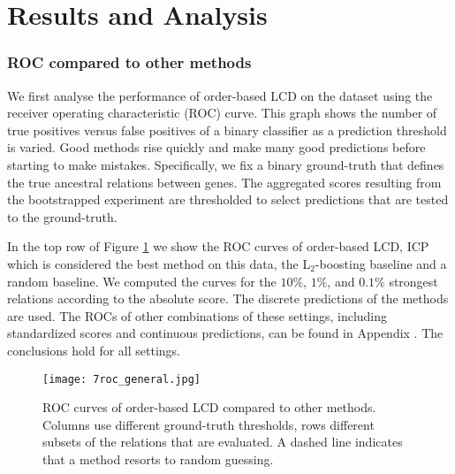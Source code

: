 \newpage
\section{Results and Analysis}
\label{chapter:analysis}






\subsubsection{ROC compared to other methods}

We first analyse the performance of order-based LCD on the \citet{kemmeren2014large} dataset using the receiver operating characteristic (ROC) curve. This graph shows the number of true positives versus false positives of a binary classifier as a prediction threshold is varied. Good methods rise quickly and make many good predictions before starting to make mistakes. Specifically, we fix a binary ground-truth that defines the true ancestral relations between genes. The aggregated scores resulting from the bootstrapped experiment are thresholded to select predictions that are tested to the ground-truth.

In the top row of Figure \ref{fig:7:rocgen} we show the ROC curves of order-based LCD, ICP which is considered the best method on this data, the L$_2$-boosting baseline and a random baseline. We computed the curves for the $10\%$, $1\%$, and $0.1\%$ strongest relations according to the absolute score. The discrete predictions of the methods are used. The ROCs of other combinations of these settings, including standardized scores and continuous predictions, can be found in Appendix . The conclusions hold for all settings.

\begin{figure}[h]
    \centering
    \texttt{[image: 7roc\_general.jpg]}
    \caption{ROC curves of order-based LCD compared to other methods. Columns use different ground-truth thresholds, rows different subsets of the relations that are evaluated. A dashed line indicates that a method resorts to random guessing.}
    \label{fig:7:rocgen}
\end{figure}

